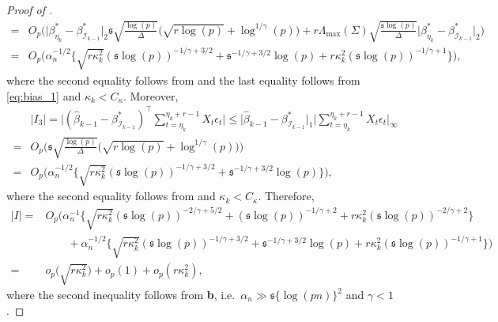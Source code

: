 \documentclass[11pt]{article}
\newcommand{\I}{{\mathcal I }}
\newcommand{\s}{ { \mathfrak{s}  } }
\theoremstyle{plain}
\theoremstyle{definition}
\begin{document}
\begin{proof}[Proof of ]
\begin{align*}
    =& O_p\bigg(\big|\beta_{\eta_{k}}^* - \beta_{\mathcal{I}_{k-1}}^*\big|_2\s\sqrt {  \frac{\log(p )} {\Delta } }\Big( \sqrt {  r\log(p) }  +  \log^{1/\gamma }(p)  \Big) + r\Lambda_{\max}(\Sigma)\sqrt{\frac{\s\log(p)}{ \Delta  }}\big|\beta_{\eta_{k}}^* - \beta_{\mathcal{I}_{k-1}}^*\big|_2\bigg)\\
    =& O_p\bigg(\alpha_n^{-1/2}\Big\{\sqrt{r\kappa_k^{2}}(\s\log(p))^{-1/\gamma +3/2} + \s^{-1/\gamma+3/2}\log(p) + r\kappa_k^{2}(\s\log(p))^{-1/\gamma +1} \Big\}\bigg),
\end{align*}
where  the second equality follows from  and the last equality follows from \eqref{eq:bias_1} and $\kappa_k < C_{\kappa}$. Moreover,
\begin{align*}
    &|I_3| = \bigg|(\widehat{\beta}_{k-1} - \beta^*_{\I_{k-1}})^{\top}\sum_{t = \eta_k}^{\eta_k + r - 1}X_t\epsilon_t\bigg| \leq \big| \widehat{\beta}_{k-1} - \beta^*_{\I_{k-1}} \big|_1\bigg| \sum_{t = \eta_k}^{\eta_k + r - 1}X_t\epsilon_t \bigg|_{\infty}\\
    =& O_p\bigg(\s\sqrt {  \frac{\log(p )} {\Delta } }\Big( \sqrt {  r\log(p) }  +  \log^{1/\gamma }(p)  \Big)\bigg)\\
    =& O_p\bigg(\alpha_n^{-1/2}\Big\{\sqrt{r\kappa_k^2}(\s\log(p))^{-1/\gamma +3/2} + \s^{-1/\gamma +3/2}\log(p)\Big\}\bigg),
\end{align*}
where the second equality follows from  and $\kappa_k < C_{\kappa}$.
Therefore,
\begin{align}\label{eq:refine_noise1}
    |I| =& O_p\bigg(\alpha_n^{-1}\Big\{\sqrt{r\kappa_k^{2}}(\s\log(p))^{-2/\gamma +5/2} + (\s\log(p))^{-1/\gamma +2} + r\kappa_k^{2}(\s\log(p))^{-2/\gamma +2}\Big\}\nonumber\\
    &\quad\quad+ \alpha_n^{-1/2}\Big\{\sqrt{r\kappa_k^2}(\s\log(p))^{-1/\gamma +3/2} + \s^{-1/\gamma +3/2}\log(p) + r\kappa_k^{2}(\s\log(p))^{-1/\gamma +1}\Big\}\bigg)\nonumber\\
    =& o_p\Big(\sqrt{r\kappa_k^2}\Big) + o_p(1) + o_p(r\kappa_k^2),
\end{align}
where the second inequality follows from \textbf{b}, i.e.~$\alpha_n \gg \s\{\log(pn)\}^2$ and $\gamma < 1$.


\end{proof}
\end{document}
